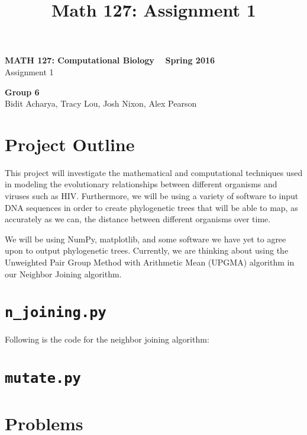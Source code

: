 \documentclass[11pt]{article}
\title{Math 127: Assignment 1}
\theoremstyle{definition}\newtheorem*{problem}{Problem}
\theoremstyle{remark}\newtheorem{claim}{Claim}
\theoremstyle{remark}\newtheorem*{sol}{Solution}
\begin{document}
\begin{center} {\Large \bf MATH 127: Computational Biology ~ Spring 2016 } \\
                [8pt]{Assignment 1\\ [8pt]}\end{center}
                
                \begin{center} \textbf{Group 6}\\ Bidit Acharya, Tracy Lou, Josh Nixon, Alex Pearson
                \end{center}
\section{Project Outline}
This project will investigate the mathematical and computational techniques used in modeling the evolutionary relationships between different organisms and viruses such as HIV. Furthermore, we will be using a variety of software to input DNA sequences in order to create phylogenetic trees that will be able to map, as accurately as we can, the distance between different organisms over time.

We will be using NumPy, matplotlib, and some software we have yet to agree upon to output phylogenetic trees. Currently, we are thinking about using the Unweighted Pair Group Method with Arithmetic Mean (UPGMA) algorithm in our Neighbor Joining algorithm.

\section{\texttt {n\_joining.py}}
Following is the code for the neighbor joining algorithm:


\section{\texttt {mutate.py}}

\section{Problems}
\end{document}
